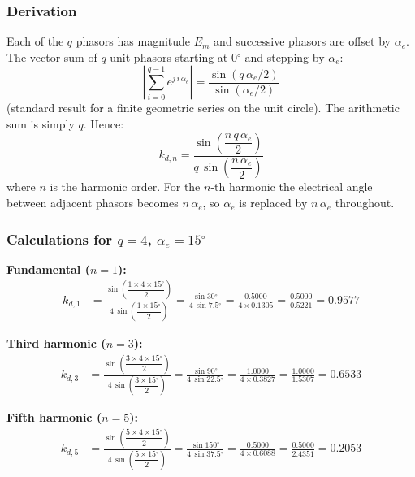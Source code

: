 \documentclass[12pt,a4paper]{article}
\newcommand{\degree}{\ensuremath{^{\circ}}}
\begin{document}
\subsubsection{Derivation}

Each of the $q$ phasors has magnitude $E_m$ and successive phasors are
offset by $\alpha_e$.
The vector sum of $q$ unit phasors starting at $0\degree$ and stepping by $\alpha_e$:
\begin{equation}
  \left|\sum_{i=0}^{q-1} e^{j\,i\,\alpha_e}\right|
  = \frac{\sin(q\,\alpha_e/2)}{\sin(\alpha_e/2)}
\end{equation}
(standard result for a finite geometric series on the unit circle).
The arithmetic sum is simply $q$.
Hence:
\begin{equation}
  \boxed{k_{d,n} = \frac{\sin\!\left(\dfrac{n\,q\,\alpha_e}{2}\right)}
                        {q\,\sin\!\left(\dfrac{n\,\alpha_e}{2}\right)}}
  \label{eq:kd_q1}
\end{equation}
where $n$ is the harmonic order.
For the $n$-th harmonic the electrical angle between adjacent phasors becomes
$n\,\alpha_e$, so $\alpha_e$ is replaced by $n\,\alpha_e$ throughout.

\subsubsection{Calculations for $q=4$, $\alpha_e = 15\degree$}

\textbf{Fundamental ($n=1$):}
\begin{align}
  k_{d,1} &= \frac{\sin\!\left(\dfrac{1 \times 4 \times 15\degree}{2}\right)}
                  {4\,\sin\!\left(\dfrac{1 \times 15\degree}{2}\right)}
           = \frac{\sin 30\degree}{4\,\sin 7.5\degree}
           = \frac{0.5000}{4 \times 0.1305}
           = \frac{0.5000}{0.5221}
           = \mathbf{0.9577}
\end{align}

\textbf{Third harmonic ($n=3$):}
\begin{align}
  k_{d,3} &= \frac{\sin\!\left(\dfrac{3 \times 4 \times 15\degree}{2}\right)}
                  {4\,\sin\!\left(\dfrac{3 \times 15\degree}{2}\right)}
           = \frac{\sin 90\degree}{4\,\sin 22.5\degree}
           = \frac{1.0000}{4 \times 0.3827}
           = \frac{1.0000}{1.5307}
           = \mathbf{0.6533}
\end{align}

\textbf{Fifth harmonic ($n=5$):}
\begin{align}
  k_{d,5} &= \frac{\sin\!\left(\dfrac{5 \times 4 \times 15\degree}{2}\right)}
                  {4\,\sin\!\left(\dfrac{5 \times 15\degree}{2}\right)}
           = \frac{\sin 150\degree}{4\,\sin 37.5\degree}
           = \frac{0.5000}{4 \times 0.6088}
           = \frac{0.5000}{2.4351}
           = \mathbf{0.2053}
\end{align}
\end{document}
